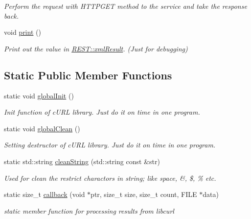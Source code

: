 \begin{DoxyCompactItemize}
\begin{DoxyCompactList}\small\item\em Perform the request with H\-T\-T\-P\-G\-E\-T method to the service and take the response back. \end{DoxyCompactList}\item 
void \hyperlink{classunisys_1_1REST_a5b8cc98e1e23f41415a8c43fe33d317b}{print} ()
\begin{DoxyCompactList}\small\item\em Print out the value in \hyperlink{classunisys_1_1REST_a8ad94e0f4cde502eafef44da193bdad0}{R\-E\-S\-T\-::xml\-Result}. (Just for debugging) \end{DoxyCompactList}\end{DoxyCompactItemize}
\subsection*{Static Public Member Functions}
\begin{DoxyCompactItemize}
\item 
static void \hyperlink{classunisys_1_1REST_af24c50c601b07b367ef85b00f433b3d8}{global\-Init} ()
\begin{DoxyCompactList}\small\item\em Init function of c\-U\-R\-L library. Just do it on time in one program. \end{DoxyCompactList}\item 
static void \hyperlink{classunisys_1_1REST_a4830ca7fe8c71189ec8e2ad64ebf44c6}{global\-Clean} ()
\begin{DoxyCompactList}\small\item\em Setting destructor of c\-U\-R\-L library. Just do it on time in one program. \end{DoxyCompactList}\item 
static std\-::string \hyperlink{classunisys_1_1REST_a2cec5087a4a1fd5eefe7b9b114f24233}{clean\-String} (std\-::string const \&str)
\begin{DoxyCompactList}\small\item\em Used for clean the restrict charactors in string; like space, \&, \$, \% etc. \end{DoxyCompactList}\item 
static size\-\_\-t \hyperlink{classunisys_1_1REST_a1d7f7cd7bd55ad084fb7c512e9569adf}{callback} (void $\ast$ptr, size\-\_\-t size, size\-\_\-t count, F\-I\-L\-E $\ast$data)
\begin{DoxyCompactList}\small\item\em static member function for processing results from libcurl \end{DoxyCompactList}\end{DoxyCompactItemize}
